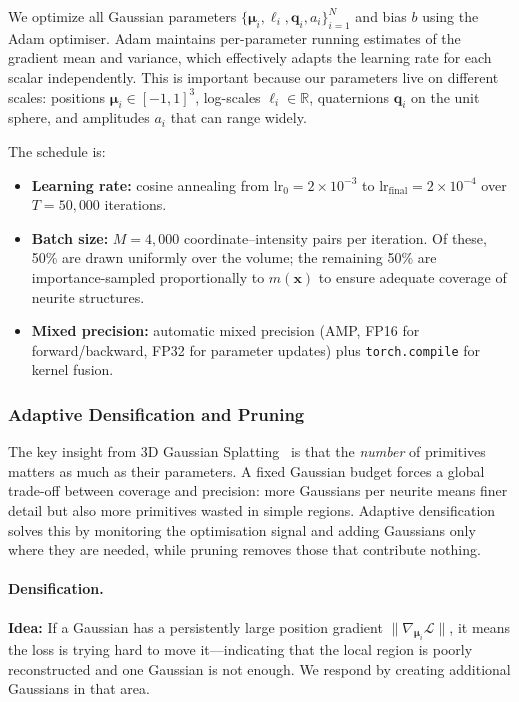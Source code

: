 \documentclass[11pt,a4paper]{article}
\begin{document}
We optimize all Gaussian parameters $\{\boldsymbol{\mu}_i, \boldsymbol{\ell}_i, \mathbf{q}_i, a_i\}_{i=1}^N$ and bias $b$ using the Adam optimiser.  Adam maintains per-parameter running estimates of the gradient mean and variance, which effectively adapts the learning rate for each scalar independently.  This is important because our parameters live on different scales: positions $\boldsymbol{\mu}_i \in [-1,1]^3$, log-scales $\boldsymbol{\ell}_i \in \mathbb{R}$, quaternions $\mathbf{q}_i$ on the unit sphere, and amplitudes $a_i$ that can range widely.

The schedule is:
\begin{itemize}
    \item \textbf{Learning rate:} cosine annealing from $\mathrm{lr}_0 = 2\times10^{-3}$ to $\mathrm{lr}_{\mathrm{final}} = 2\times10^{-4}$ over $T = 50{,}000$ iterations.
    \item \textbf{Batch size:} $M = 4{,}000$ coordinate--intensity pairs per iteration.  Of these, 50\% are drawn uniformly over the volume; the remaining 50\% are importance-sampled proportionally to $m(\mathbf{x})$ to ensure adequate coverage of neurite structures.
    \item \textbf{Mixed precision:} automatic mixed precision (AMP, FP16 for forward/backward, FP32 for parameter updates) plus \texttt{torch.compile} for kernel fusion.
\end{itemize}

\subsubsection{Adaptive Densification and Pruning}

The key insight from 3D Gaussian Splatting~\cite{kerbl20233d} is that the \emph{number} of primitives matters as much as their parameters.  A fixed Gaussian budget forces a global trade-off between coverage and precision: more Gaussians per neurite means finer detail but also more primitives wasted in simple regions.  Adaptive densification solves this by monitoring the optimisation signal and adding Gaussians only where they are needed, while pruning removes those that contribute nothing.

\paragraph{Densification.}
\textbf{Idea:} If a Gaussian has a persistently large position gradient $\|\nabla_{\boldsymbol{\mu}_i}\mathcal{L}\|$, it means the loss is trying hard to move it---indicating that the local region is poorly reconstructed and one Gaussian is not enough.  We respond by creating additional Gaussians in that area.
\end{document}
